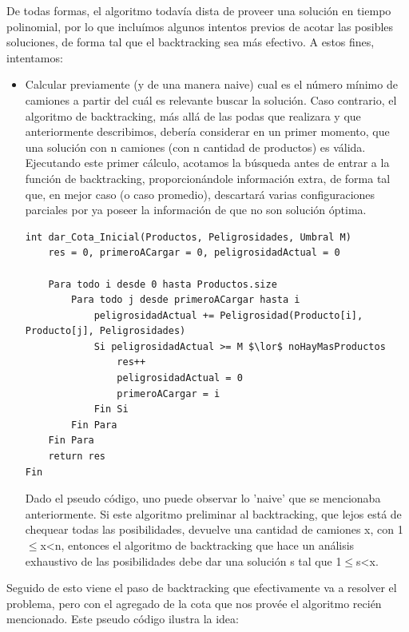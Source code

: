 \documentclass[10pt,a4paper]{article}
\begin{document}
De todas formas, el algoritmo todavía dista de proveer una solución en tiempo polinomial, por lo que incluímos algunos intentos previos de acotar las posibles soluciones, de forma tal que el backtracking sea más efectivo. A estos fines, intentamos:

\begin{itemize}

\item Calcular previamente (y de una manera naive) cual es el número mínimo de camiones a partir del cuál es relevante buscar la solución. Caso contrario, el algoritmo de backtracking, más allá de las podas que realizara y que anteriormente describimos, debería considerar en un primer momento, que una solución con n camiones (con n cantidad de productos) es válida. Ejecutando este primer cálculo, acotamos la búsqueda antes de entrar a la función de backtracking, proporcionándole información extra, de forma tal que, en mejor caso (o caso promedio), descartará varias configuraciones parciales por ya poseer la información de que no son solución óptima.

\begin{lstlisting}[mathescape]
int dar_Cota_Inicial(Productos, Peligrosidades, Umbral M)
	res = 0, primeroACargar = 0, peligrosidadActual = 0
	
	Para todo i desde 0 hasta Productos.size
		Para todo j desde primeroACargar hasta i
			peligrosidadActual += Peligrosidad(Producto[i], Producto[j], Peligrosidades)
			Si peligrosidadActual >= M $\lor$ noHayMasProductos
				res++
				peligrosidadActual = 0
				primeroACargar = i
			Fin Si
		Fin Para
	Fin Para
	return res
Fin
\end{lstlisting}

Dado el pseudo código, uno puede observar lo 'naive' que se mencionaba anteriormente. Si este algoritmo \noindent preliminar al backtracking, que lejos está de chequear todas las posibilidades, devuelve una cantidad de camiones x, con 1$\leq$x\textless n, entonces el algoritmo de backtracking que hace un análisis exhaustivo de las posibilidades debe dar una solución s tal que 1$\leq$s\textless x.

\end{itemize}

Seguido de esto viene el paso de backtracking que efectivamente va a resolver el problema, pero con el agregado de la cota que nos provée el algoritmo recién mencionado. Este pseudo código ilustra la idea:
\end{document}
